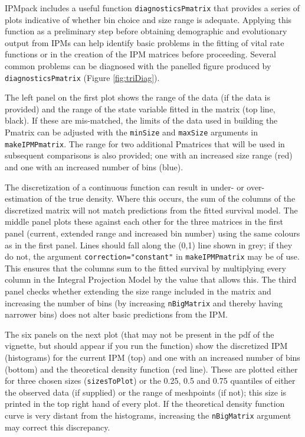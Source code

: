\documentclass{article}
\begin{document}
IPMpack includes a useful function {\tt diagnosticsPmatrix} that provides a
series of plots indicative of whether bin choice and size range is adequate.
Applying this function as a preliminary step before obtaining demographic and evolutionary output from IPMs can help identify basic problems in the fitting of vital rate functions or in the creation of the IPM matrices before proceeding. Several common problems can be diagnosed with the panelled figure produced by {\tt diagnosticsPmatrix} (Figure
\ref{fig:triDiag}).

The left panel on the first plot shows the range of the data (if the data is provided) and the range of the state variable fitted in the matrix (top line, black).  If these are mis-matched, the limits of the data used in building the Pmatrix can be adjusted with the {\tt minSize} and {\tt maxSize} arguments in {\tt makeIPMPmatrix}.  The range for two additional Pmatrices that will be used in subsequent comparisons is also provided; one with an increased size range (red) and one with an increased number of bins (blue). 

The discretization of a continuous function can result in under- or over-estimation of the true density. Where this occurs, the sum of the columns of the discretized matrix will not match predictions from the fitted survival model.  The middle panel 
plots these against each other for the three matrices in the first panel (current, extended range and increased bin number) using the same colours as in the first panel. Lines should fall along the (0,1) line shown in grey; if they do not, the argument {\tt correction="constant"} in {\tt makeIPMPmatrix} may be of use. This ensures that the columns sum to the fitted survival by multiplying every column in the Integral Projection Model by the value that allows this. The third panel checks whether extending the size range included in the matrix and increasing the number of bins (by increasing {\tt nBigMatrix} and thereby having narrower bins) does not alter basic predictions from the IPM.

The six panels on the next plot (that may not be present in the pdf of the vignette, but should appear if you run the function) show the discretized IPM (histograms) for the current IPM (top) and one with an increased number of bins (bottom)  and the
theoretical density function (red line). These are plotted either for three chosen sizes ({\tt sizesToPlot}) or the 0.25, 0.5 and 0.75 quantiles of either the observed data (if supplied) or the range of meshpoints (if not); this size is printed in the top right hand of every plot. If the theoretical density function curve is very distant from the histograms, increasing the {\tt nBigMatrix} argument may correct this discrepancy. 
\end{document}
